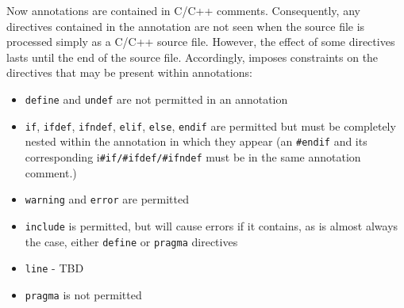 Now \acslb annotations are contained in C/C++ comments. 
Consequently, any directives contained in the annotation are not seen when the source file is processed simply as a C/C++ source file. However, the effect of some directives lasts until the end of the source file. 
Accordingly, \acslpp imposes constraints on the directives that may be present within annotations:
\begin{itemize}
	\item \texttt{define} and \texttt{undef} are not permitted in an annotation
	\item \texttt{if}, \texttt{ifdef}, \texttt{ifndef}, \texttt{elif}, \texttt{else}, \texttt{endif} are permitted but must be completely nested within the annotation in which they appear (an \texttt{\#endif} and its corresponding i\texttt{\#if/\#ifdef/\#ifndef} must be in the same annotation comment.)
	\item \texttt{warning} and \texttt{error} are permitted
	\item \texttt{include} is permitted, but will cause errors if it contains, as is almost always the case, either \texttt{define} or \texttt{pragma} directives
	\item \texttt{line} - TBD
	\item \texttt{pragma} is not permitted
\end{itemize}

